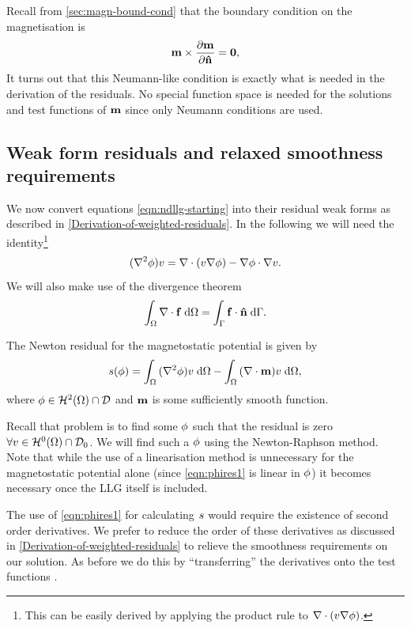 Recall from \cref{sec:magn-bound-cond} that the boundary condition on the magnetisation is
\begin{equation}
  \label{eq:m-bc}
  \mathbf{m} \times \frac{\partial \mathbf{m}}{\partial \mathbf{\hat{n}}} = \mathbf{0},
\end{equation}
It turns out that this Neumann-like condition is exactly what is needed in the derivation of the residuals.
No special function space is needed for the solutions and test functions of $\mathbf{m}$ since only Neumann conditions are used.


\subsection{Weak form residuals and relaxed smoothness requirements}
\label{sec:weak-form-residuals}

We now convert equations \cref{eqn:ndllg-starting} into their residual weak forms as described in \cref{Derivation-of-weighted-residuals}.
In the following we will need the identity\footnote{This can be easily derived by applying the product rule to $\nabla \cdot (v \nabla \phi)$.}
\begin{equation}
  (\nabla^2 \phi) v = \nabla \cdot (v \nabla \phi) - \nabla \phi \cdot \nabla v.
  \label{eq:20}
\end{equation}
We will also make use of the divergence theorem
\begin{equation}
  {\int_{\Omega} {\nabla \cdot{\mathbf{f}}} {\; \mathrm{{d}}}{\Omega}} = {\int_{{\Gamma}} {{\mathbf{f}} \cdot \mathbf{\hat{n}}} {\; \mathrm{{d}}} {{\Gamma}}}.
  \label{eq:div-thm}
\end{equation}

The Newton residual for the magnetostatic potential is given by
\begin{gather}
  s(\phi) = {\int_{\Omega} { (\nabla^2 \phi) v } {\; \mathrm{{d}}} {\Omega}}
  - {\int_{\Omega} { (\nabla \cdot \mathbf{m}) v} {\; \mathrm{{d}}} {\Omega}}, \label{eqn:phires1}
\end{gather}
where $\phi \in \mathcal{H}^2(\Omega) \cap \mathcal{D}$ and $\mathbf{m}$ is some sufficiently smooth function.

Recall that problem is to find some $\phi$ such that the residual is zero $\forall v \in \mathcal{H}^0(\Omega) \cap \mathcal{D}_0$.
We will find such a $\phi$ using the Newton-Raphson method.
Note that while the use of a linearisation method is unnecessary for the magnetostatic potential alone (since \cref{eqn:phires1} is linear in $\phi$) it becomes necessary once the LLG itself is included.

The use of \cref{eqn:phires1} for calculating $s$ would require the existence of second order derivatives.
We prefer to reduce the order of these derivatives as discussed in \cref{Derivation-of-weighted-residuals} to relieve the smoothness requirements on our solution.
As before we do this by ``transferring'' the derivatives onto the test functions \cite{HowardElmanDavidSilvester2006}.

